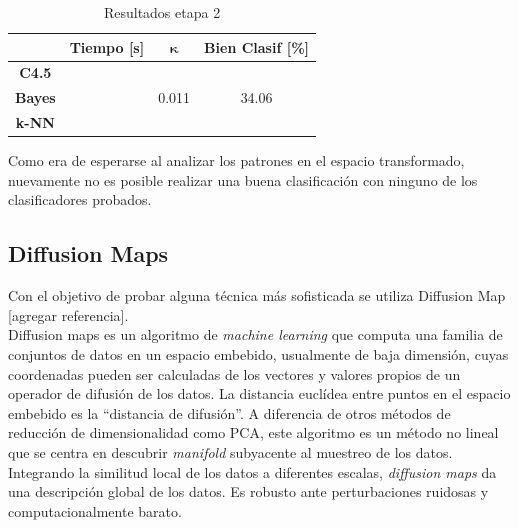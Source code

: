 \documentclass[12pt,a4paper,titlepage]{report}
\newcommand{\bs}{\boldsymbol}
\begin{document}
\begin{table}[H]
\centering
	\begin{tabular}{c|c|c|c|} 
	\cline{2-4}
	& \multicolumn{1}{c|}{\cellcolor[gray]{0.7} \textbf{Tiempo [s]}}  
	& \multicolumn{1}{c|}{\cellcolor[gray]{0.7} $\bs\kappa$}
	& \multicolumn{1}{c|}{\cellcolor[gray]{0.7} \textbf{Bien Clasif [\%]}} \\ \hline
	
	\multicolumn{1}{|c|}{\cellcolor[gray]{0.8} \textbf{C4.5}}   &  &  & \cellcolor[gray]{0.9}  \\ \hline
	\multicolumn{1}{|c|}{\cellcolor[gray]{0.8} \textbf{Bayes}}  &  & 0.011 & \cellcolor[gray]{0.9} 34.06 \\ \hline
	\multicolumn{1}{|c|}{\cellcolor[gray]{0.8} \textbf{k-NN}}   &  &  & \cellcolor[gray]{0.9} \\ \hline
	\end{tabular} 
	\caption{Resultados etapa 2}
	\label{tab:resultados_LDA}
\end{table}

Como era de esperarse al analizar los patrones en el espacio transformado, nuevamente no es posible realizar una buena clasificación con ninguno de los clasificadores probados.


\subsection{Diffusion Maps}
Con el objetivo de probar alguna técnica más sofisticada se utiliza Diffusion Map [agregar referencia].\\

Diffusion maps es un algoritmo de \emph{machine learning} que computa una familia de conjuntos de datos en un espacio embebido, usualmente de baja dimensión, cuyas coordenadas pueden ser calculadas de los vectores y valores propios de un operador de difusión de los datos. La distancia euclídea entre puntos en el espacio embebido es la ``distancia de difusión''. A diferencia de otros métodos de reducción de dimensionalidad como PCA, este algoritmo es un método no lineal que se centra en descubrir \emph{manifold} subyacente al muestreo de los datos. Integrando la similitud local de los datos a diferentes escalas, \emph{diffusion maps} da una descripción global de los datos. Es robusto ante perturbaciones ruidosas y computacionalmente barato.\\
\end{document}
